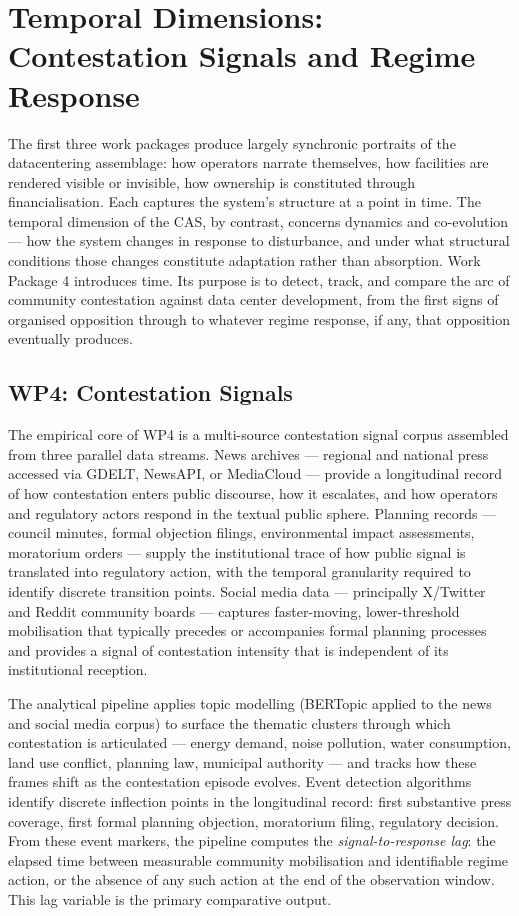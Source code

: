 \section{Temporal Dimensions: Contestation Signals and Regime Response}
\label{sec:temporal}

The first three work packages produce largely synchronic portraits of the datacentering assemblage: how operators narrate themselves, how facilities are rendered visible or invisible, how ownership is constituted through financialisation. Each captures the system's structure at a point in time. The temporal dimension of the CAS, by contrast, concerns dynamics and co-evolution — how the system changes in response to disturbance, and under what structural conditions those changes constitute adaptation rather than absorption. Work Package 4 introduces time. Its purpose is to detect, track, and compare the arc of community contestation against data center development, from the first signs of organised opposition through to whatever regime response, if any, that opposition eventually produces.

\subsection{WP4: Contestation Signals}

The empirical core of WP4 is a multi-source contestation signal corpus assembled from three parallel data streams. News archives — regional and national press accessed via GDELT, NewsAPI, or MediaCloud — provide a longitudinal record of how contestation enters public discourse, how it escalates, and how operators and regulatory actors respond in the textual public sphere. Planning records — council minutes, formal objection filings, environmental impact assessments, moratorium orders — supply the institutional trace of how public signal is translated into regulatory action, with the temporal granularity required to identify discrete transition points. Social media data — principally X/Twitter and Reddit community boards — captures faster-moving, lower-threshold mobilisation that typically precedes or accompanies formal planning processes and provides a signal of contestation intensity that is independent of its institutional reception.

The analytical pipeline applies topic modelling (BERTopic applied to the news and social media corpus) to surface the thematic clusters through which contestation is articulated — energy demand, noise pollution, water consumption, land use conflict, planning law, municipal authority — and tracks how these frames shift as the contestation episode evolves. Event detection algorithms identify discrete inflection points in the longitudinal record: first substantive press coverage, first formal planning objection, moratorium filing, regulatory decision. From these event markers, the pipeline computes the \textit{signal-to-response lag}: the elapsed time between measurable community mobilisation and identifiable regime action, or the absence of any such action at the end of the observation window. This lag variable is the primary comparative output.

